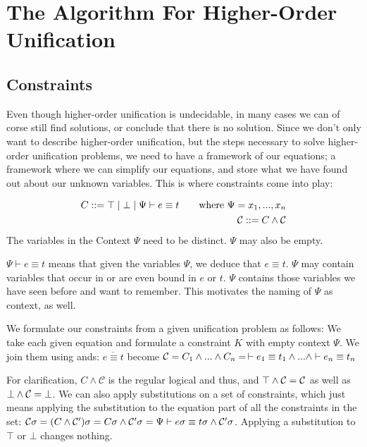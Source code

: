 \documentclass[twoside,12pt,a4paper]{article}
\begin{document}
\section{The Algorithm For Higher-Order Unification}\label{The Algorithm For Higher-Order Unification}

\subsection{Constraints}

Even though higher-order unification is undecidable, in many cases we can of corse still find solutions,
or conclude that there is no solution.
Since we don't only want to describe higher-order unification, but the steps necessary to solve higher-order unification problems,
we need to have a framework of our equations; a framework where we can simplify our equations,
and store what we have found out about our unknown variables. This is where constraints come into play:

\begin{definition}[Constraint]
    \begin{align*}
        C ::= \top \;|\; \bot \;|\; \Psi \vdash e\equiv t \tag*{where $\Psi = x_1, ..., x_n$}\\
        \mathcal{C} ::= C \wedge \mathcal{C}
    \end{align*}
    The variables in the Context $\Psi$ need to be distinct. $\Psi$ may also be empty.
\end{definition}
$\Psi \vdash e\equiv t$ means that given the variables $\Psi$, we deduce that $e\equiv t$.
$\Psi$ may contain variables that occur in or are even bound in $e$ or $t$. 
$\Psi$ contains those variables we have seen before and want to remember. This motivates the naming of $\Psi$ as context, as well.

We formulate our constraints from a given unification problem as follows:
We take each given equation and formulate a constraint $K$ with empty context $\Psi$. We join them using ands:
$\overline{e\equiv t}$ become $\mathcal{C} = C_1 \wedge ... \wedge C_n = \, \vdash e_1 \equiv t_1 \wedge ...\wedge \vdash e_n \equiv t_n $  

For clarification, $C \wedge \mathcal{C}$ is the regular logical and thus, 
and $\top \wedge \mathcal{C} = \mathcal{C}$ as well as $\bot \wedge \mathcal{C} = \bot$.
We can also apply substitutions on a set of constraints, which just means applying the substitution to the equation part of all the constraints in the set:
$\mathcal{C} \sigma = (C \wedge \mathcal{C}')\sigma = C \sigma \wedge \mathcal{C}' \sigma  
= \Psi \vdash e\sigma\equiv t\sigma\wedge \mathcal{C}'\sigma$. Applying a substitution to $\top$ or $\bot$ changes nothing.
\end{document}
